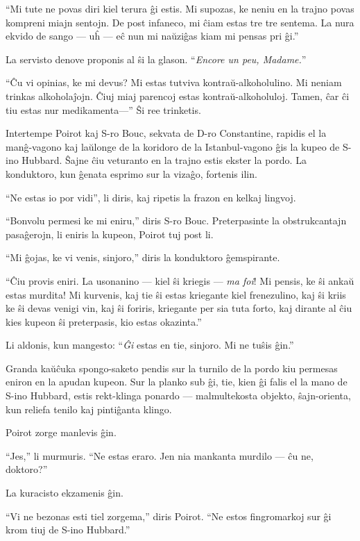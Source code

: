``Mi tute ne povas diri kiel terura ĝi estis. Mi supozas, ke neniu en la trajno povas kompreni miajn sentojn. De post infaneco, mi ĉiam estas tre tre sentema. La nura ekvido de sango --- uĥ --- eĉ nun mi naŭziĝas kiam mi pensas pri ĝi.''

La servisto denove proponis al ŝi la glason. ``\emph{Encore un peu, Madame.}''

``Ĉu vi opinias, ke mi devus? Mi estas tutviva kontraŭ-alkoholulino. Mi neniam trinkas alkoholaĵojn. Ĉiuj miaj parencoj estas kontraŭ-alkoholuloj. Tamen, ĉar ĉi tiu estas nur medikamenta---'' Ŝi ree trinketis.

Intertempe Poirot kaj S-ro Bouc, sekvata de D-ro Constantine, rapidis el la manĝ-vagono kaj laŭlonge de la koridoro de la Istanbul-vagono ĝis la kupeo de S-ino Hubbard. Ŝajne ĉiu veturanto en la trajno estis ekster la pordo. La konduktoro, kun ĝenata esprimo sur la vizaĝo, fortenis ilin.

``Ne estas io por vidi'', li diris, kaj ripetis la frazon en kelkaj lingvoj.

``Bonvolu permesi ke mi eniru,'' diris S-ro Bouc. Preterpasinte la obstrukcantajn pasaĝerojn, li eniris la kupeon, Poirot tuj post li.

``Mi ĝojas, ke vi venis, sinjoro,'' diris la konduktoro ĝemspirante.

``Ĉiu provis eniri. La usonanino --- kiel ŝi kriegis --- \emph{ma foi}! Mi pensis, ke ŝi ankaŭ estas murdita! Mi kurvenis, kaj tie ŝi estas kriegante kiel frenezulino, kaj ŝi kriis ke ŝi devas venigi vin, kaj ŝi foriris, kriegante per sia tuta forto, kaj dirante al ĉiu kies kupeon ŝi preterpasis, kio estas okazinta.''

Li aldonis, kun mangesto: ``\emph{Ĝi} estas en tie, sinjoro. Mi ne tuŝis ĝin.''

Granda kaŭĉuka spongo-saketo pendis sur la turnilo de la pordo kiu permesas eniron en la apudan kupeon. Sur la planko sub ĝi, tie, kien ĝi falis el la mano de S-ino Hubbard, estis rekt-klinga ponardo --- malmultekosta objekto, ŝajn-orienta, kun reliefa tenilo kaj pintiĝanta klingo.

Poirot zorge manlevis ĝin.

``Jes,'' li murmuris. ``Ne estas eraro. Jen nia mankanta murdilo --- ĉu ne, doktoro?''

La kuracisto ekzamenis ĝin.

``Vi ne bezonas esti tiel zorgema,'' diris Poirot. ``Ne estos fingromarkoj sur ĝi krom tiuj de S-ino Hubbard.''

